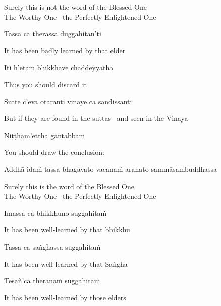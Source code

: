 \begin{english}
  Surely this is not the word of the Blessed One\\
  The Worthy One \breathmark\ the Perfectly Enlightened One
\end{english}

Tassa ca therassa duggahitan'ti

\begin{english}
  It has been badly learned by that elder
\end{english}

Iti h'etaṁ bhikkhave chaḍḍeyyātha

\begin{english}
  Thus you should discard it
\end{english}

Sutte c'eva otaranti vinaye ca sandissanti

\begin{english}
  But if they are found in the suttas \breathmark\ and seen in the Vinaya
\end{english}

Niṭṭham'ettha gantabbaṁ

\begin{english}
  You should draw the conclusion:
\end{english}

\begin{pali-hang}
  Addhā idaṁ tassa bhagavato vacanaṁ arahato sammāsambuddhassa
\end{pali-hang}

\begin{english}
  Surely this is the word of the Blessed One\\
  The Worthy One \breathmark\ the Perfectly Enlightened One
\end{english}

Imassa ca bhikkhuno suggahitaṁ

\begin{english}
  It has been well-learned by that bhikkhu
\end{english}

Tassa ca saṅghassa suggahitaṁ

\begin{english}
  It has been well-learned by that Saṅgha
\end{english}

Tesañ'ca therānaṁ suggahitaṁ

\begin{english}
  It has been well-learned by those elders
\end{english}


